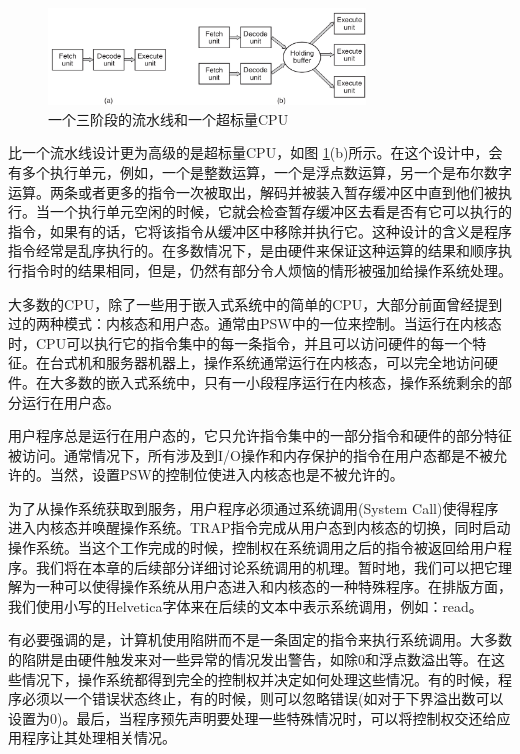 	\begin{figure}[ht]\small
		\centering
		\includegraphics[width=0.75\textwidth]{FIG/1-7.png}
		\caption{一个三阶段的流水线和一个超标量CPU}\label{fig:pipeline}
	\end{figure}
	
	比一个流水线设计更为高级的是超标量CPU，如图 \ref{fig:pipeline}(b)所示。在这个设计中，会有多个执行单元，例如，一个是整数运算，一个是浮点数运算，另一个是布尔数字运算。两条或者更多的指令一次被取出，解码并被装入暂存缓冲区中直到他们被执行。当一个执行单元空闲的时候，它就会检查暂存缓冲区去看是否有它可以执行的指令，如果有的话，它将该指令从缓冲区中移除并执行它。这种设计的含义是程序指令经常是乱序执行的。在多数情况下，是由硬件来保证这种运算的结果和顺序执行指令时的结果相同，但是，仍然有部分令人烦恼的情形被强加给操作系统处理。
	
	大多数的CPU，除了一些用于嵌入式系统中的简单的CPU，大部分前面曾经提到过的两种模式：内核态和用户态。通常由PSW中的一位来控制。当运行在内核态时，CPU可以执行它的指令集中的每一条指令，并且可以访问硬件的每一个特征。在台式机和服务器机器上，操作系统通常运行在内核态，可以完全地访问硬件。在大多数的嵌入式系统中，只有一小段程序运行在内核态，操作系统剩余的部分运行在用户态。
	
	用户程序总是运行在用户态的，它只允许指令集中的一部分指令和硬件的部分特征被访问。通常情况下，所有涉及到I/O操作和内存保护的指令在用户态都是不被允许的。当然，设置PSW的控制位使进入内核态也是不被允许的。
	
	为了从操作系统获取到服务，用户程序必须通过系统调用(System Call)使得程序进入内核态并唤醒操作系统。TRAP指令完成从用户态到内核态的切换，同时启动操作系统。当这个工作完成的时候，控制权在系统调用之后的指令被返回给用户程序。我们将在本章的后续部分详细讨论系统调用的机理。暂时地，我们可以把它理解为一种可以使得操作系统从用户态进入和内核态的一种特殊程序。在排版方面，我们使用小写的Helvetica字体来在后续的文本中表示系统调用，例如：read。
	
	有必要强调的是，计算机使用陷阱而不是一条固定的指令来执行系统调用。大多数的陷阱是由硬件触发来对一些异常的情况发出警告，如除0和浮点数溢出等。在这些情况下，操作系统都得到完全的控制权并决定如何处理这些情况。有的时候，程序必须以一个错误状态终止，有的时候，则可以忽略错误(如对于下界溢出数可以设置为0)。最后，当程序预先声明要处理一些特殊情况时，可以将控制权交还给应用程序让其处理相关情况。
	
